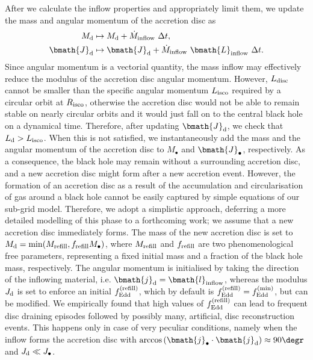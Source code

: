 \documentclass[a4paper,fleqn,usenatbib]{mnras}
\begin{document}
After we calculate the inflow properties and appropriately limit them, we update the mass and angular momentum of the accretion disc as
\begin{equation}
\begin{aligned}
M_{\rm d} & \mapsto M_{\rm d} + \dot{M}_{\rm inflow}~\Delta t, \\
\bmath{J}_{\rm d} & \mapsto \bmath{J}_{\rm d} + \dot{M}_{\rm inflow}~\bmath{L}_{\rm inflow}~\Delta t.
\end{aligned}
\end{equation}
Since angular momentum is a vectorial quantity, the mass inflow may effectively reduce the modulus of the accretion disc angular momentum.
However, $L_{\rm disc}$ cannot be smaller than the specific angular momentum $L_{\rm isco}$ required by a circular orbit at $R_{\rm isco}$, otherwise the accretion disc would not be able to remain stable on nearly circular orbits and it would just fall on to the central black hole on a dynamical time.
Therefore, after updating $\bmath{J}_{\rm d}$, we check that $L_{\rm d} > L_{\rm isco}$.
When this is not satisfied, we instantaneously add the mass and the angular momentum of the accretion disc to $M_{\bullet}$ and $\bmath{J}_{\bullet}$, respectively.
As a consequence, the black hole may remain without a surrounding accretion disc, and a new accretion disc might form after a new accretion event.
However, the formation of an accretion disc as a result of the accumulation and circularisation of gas around a black hole cannot be easily captured by simple equations of our sub-grid model.
Therefore, we adopt a simplistic approach, deferring a more detailed modelling of this phase to a forthcoming work; we assume that a new accretion disc immediately forms.
The mass of the new accretion disc is set to $M_{\rm d} = \min(M_{\rm refill}, f_{\rm refill} M_{\bullet})$, where $M_{\rm refill}$ and $f_{\rm refill}$ are two phenomenological free parameters, representing a fixed initial mass and a fraction of the black hole mass, respectively.
The angular momentum is initialised by taking the direction of the inflowing material, i.e. $\bmath{j}_{\rm d} = \bmath{l}_{\rm inflow}$, whereas the modulus $J_{\rm d}$ is set to enforce an initial $f_{\rm Edd}^{\rm (refill)}$, which by default is $f_{\rm Edd}^{\rm (refill)} = f_{\rm Edd}^{\rm (min)}$, but can be modified. 
We empirically found that high values of $f_{\rm Edd}^{\rm (refill)}$ can lead to frequent disc draining episodes followed by possibly many, artificial, disc reconstruction events.
This happens only in case of very peculiar conditions, namely when the inflow forms the accretion disc with $\arccos \left( \bmath{j}_{\bullet} \cdot \bmath{j}_{\rm d} \right) \approx 90\degr$ and $J_{\rm d} \ll J_{\bullet}$.
\end{document}
